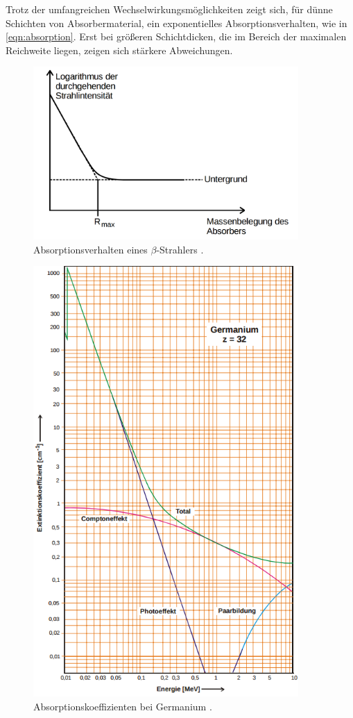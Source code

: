 \documentclass[
  bibliography=totoc,     %
  captions=tableheading,  %
  titlepage=firstiscover, %
]{scrartcl}
\begin{document}
\noindent
Trotz der umfangreichen Wechselwirkungsmöglichkeiten zeigt sich, für dünne Schichten
von Absorbermaterial, ein exponentielles Absorptionsverhalten, wie in \eqref{eqn:absorption}.
Erst bei größeren Schichtdicken, die im Bereich der maximalen Reichweite liegen,
zeigen sich stärkere Abweichungen.
\begin{figure}[htb]
  \centering
  \includegraphics[width=0.9\textwidth]{V7042.png}
  \caption{Absorptionsverhalten eines $\beta$-Strahlers \cite{anleitung}.}
  \label{fig:V7042}
\end{figure}
\begin{figure}[htb]
  \centering
  \includegraphics[width=0.9\textwidth]{V7041.png}
  \caption{Absorptionskoeffizienten bei Germanium \cite{anleitung}.}
  \label{fig:V7041}
\end{figure}
\end{document}
